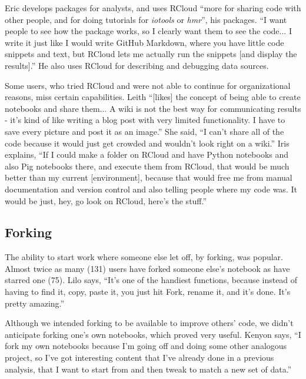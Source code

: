 Eric develops packages for analysts, and uses RCloud ``more for sharing code with
other people, and for doing tutorials for {\em iotools} or {\em hmr}'', his packages.
``I want people to see how the package works, so I clearly want them
to see the code... I write it just like I would write GitHub
Markdown, where you have little code snippets and text, but RCloud lets me
actually run the snippets [and display the results].'' He also uses RCloud for
describing and debugging data sources.

Some users, who tried RCloud and were not able to continue for organizational
reasons, miss certain capabilities. Leith ``[likes] the concept of being
able to create notebooks and share them... A wiki is not the best way for
communicating results - it's kind of like writing a blog post with very limited
functionality. I have to save every picture and post it as an image.'' She said,
``I can't share all of the code because it would just get crowded and wouldn't
look right on a wiki.'' Iris explains, ``If I could make a folder on RCloud and
have Python notebooks and also Pig notebooks there, and execute them from RCloud,
that would be much better than my current [environment], because that would free
me from manual documentation and version control and also telling people where
my code was. It would be just, hey, go look on RCloud, here's the stuff.''



\subsection{Forking}
The ability to start work where someone else let off, by forking, was popular.
Almost twice as many (131) users have forked
someone else's notebook as have starred one (75). Lilo says, ``It's one of the
handiest functions, because instead of having to find it, copy, paste it, you
just hit Fork, rename it, and it's done. It's pretty amazing.''

Although we intended forking to be available to improve others' code, we 
didn't anticipate forking one's own notebooks, which
proved very useful. Kenyon says, ``I fork my own notebooks because I'm going off
and doing some other analogous project, so I've got interesting content that I've
already done in a previous analysis, that I want to start from and then tweak
to match a new set of data.''


